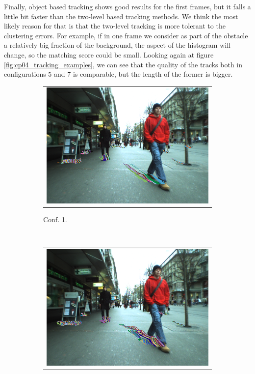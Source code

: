 Finally, object based tracking shows good results for the first frames, but it falls a little bit faster than the two-level based tracking methods. We think the most likely reason for that is that the two-level tracking is more tolerant to the clustering errors. For example, if in one frame we consider as part of the obstacle a relatively big fraction of the background, the aspect of the histogram will change, so the matching score could be small. Looking again at figure \ref{fig:cp04_tracking_examples}, we can see that the quality of the tracks both in configurations 5 and 7 is comparable, but the length of the former is bigger.

\begin{figure}[h!]
        \centering
        \begin{subfigure}[b]{0.33\textwidth}
	  \begin{tabular}{c}
	    \includegraphics[width=\textwidth]{trackingConf1}
	  \end{tabular}
	  \caption{Conf. 1.}\label{fig:cp04_tracking_example_conf_1}
        \end{subfigure}%
        ~
        \begin{subfigure}[b]{0.33\textwidth}
	  \begin{tabular}{c}
	    \includegraphics[width=\textwidth]{trackingConf5}

\end{tabular}
\end{subfigure}
\end{figure}
